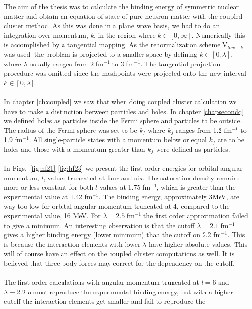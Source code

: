 The aim of the thesis was to calculate the binding energy of symmetric nuclear
matter and obtain an equation of state of pure neutron matter with the coupled
cluster method. As this was done in a plane wave basis, we had to do an
integration over momentum, $k$, in the region where $k\in[0,\infty]$.
Numerically this is accomplished by a tangential mapping. As the
renormalization scheme V$_{low-k}$ was used, the problem is projected to
a smaller space by defining $k\in[0,\lambda]$, where $\lambda$ usually ranges from 2
fm$^{-1}$ to 3 fm$^{-1}$. The tangential projection procedure was omitted since
the meshpoints were projected onto the new interval $k\in[0,\lambda]$.\\
\\
In chapter \ref{ch:coupled} we saw that when doing coupled cluster calculation
we have to make a distinction between particles and holes. In chapter
\ref{chapsecondq} we defined holes as particles inside the Fermi sphere and
particles to be outside. The radius of the Fermi sphere was set to be $k_f$
where $k_f$ ranges from 1.2 fm$^{-1}$ to 1.9 fm$^{-1}$. All single-particle
states with a momentum below or equal $k_f$ are to be holes and those with a
momentum greater than $k_f$ were defined as particles.\\
\\
In Figs.~\ref{fig:hf21}-\ref{fig:hf23} we present the first-order energies for orbital angular momentum, $l$, values
truncated at four and six.  The saturation density remains more or less constant
for both $l$-values at 1.75 fm$^{-1}$, which is greater than the experimental
value at 1.42 fm$^{-1}$. The binding energy, approximately $3$MeV, are way too low for orbital angular momentum
truncated at 4, compared to the experimental value, 16 MeV. For $\lambda=2.5$
fm$^{-1}$ the first order approximation failed to give a minimum.
An interesting observation is that the
cutoff  $\lambda=2.1$ fm$^{-1}$ gives a higher binding energy (lower minimum) than the cutoff
on 2.2 fm$^{-1}$. This is because the  interaction elements with lower $\lambda$
have higher absolute values. This will of course have an effect on the coupled cluster
computations as well. It is believed that three-body forces may correct for the dependency on the cutoff.\\
\\
The first-order calculations with angular momentum truncated at $l=6$ and 
$\lambda=2.2$ almost reproduce the experimental binding energy, but with a 
higher cutoff the interaction elements get smaller and fail to reproduce the 
